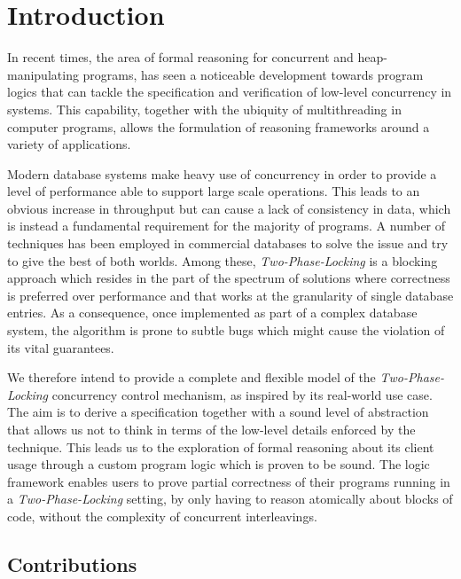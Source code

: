 \section{Introduction}

In recent times, the area of formal reasoning for concurrent and heap-manipulating programs, has seen a noticeable development towards program logics that can tackle the specification and verification of low-level concurrency in systems. This capability, together with the ubiquity of multithreading in computer programs, allows the formulation of reasoning frameworks around a variety of applications.

Modern database systems make heavy use of concurrency in order to provide a level of performance able to support large scale operations. This leads to an obvious increase in throughput but can cause a lack of consistency in data, which is instead a fundamental requirement for the majority of programs. A number of techniques has been employed in commercial databases to solve the issue and try to give the best of both worlds. Among these, \textit{Two-Phase-Locking} is a blocking approach which resides in the part of the spectrum of solutions where correctness is preferred over performance and that works at the granularity of single database entries. As a consequence, once implemented as part of a complex database system, the algorithm is prone to subtle bugs which might cause the violation of its vital guarantees.

We therefore intend to provide a complete and flexible model of the \textit{Two-Phase-Locking} concurrency control mechanism, as inspired by its real-world use case.
The aim is to derive a specification together with a sound level of abstraction that allows us not to think in terms of the low-level details enforced by the technique.
This leads us to the exploration of formal reasoning about its client usage through a custom program logic which is proven to be sound. The logic framework enables users to prove partial correctness of their programs running in a \textit{Two-Phase-Locking} setting, by only having to reason atomically about blocks of code, without the complexity of concurrent interleavings.

\subsection{Contributions}

